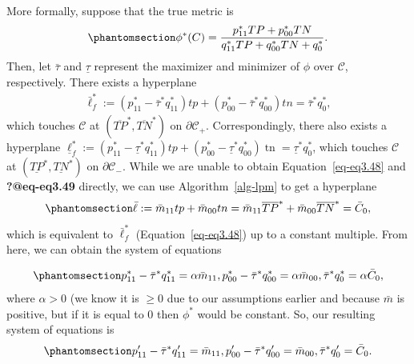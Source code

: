 \documentclass[
  letterpaper,
  numbers=noenddot,
  DIV=11]{scrreprt}
\theoremstyle{plain}
\theoremstyle{definition}
\theoremstyle{remark}
\begin{document}
More formally, suppose that the true metric is
\begin{equation}\phantomsection\label{eq-eq3.48}{\phi^{*}(C)=\frac{p_{11}^{*} T P+p_{00}^{*} T N}{q_{11}^{*} T P+q_{00}^{*} T N+q_{0}^{*}}.}\end{equation}
Then, let \(\bar{\tau}\) and \(\underline{\tau}\) represent the
maximizer and minimizer of \(\phi\) over \(\mathcal{C}\), respectively.
There exists a hyperplane \[\begin{aligned}
\bar{\ell}_{f}^{*}:=\left(p_{11}^{*}-\bar{\tau}^{*} q_{11}^{*}\right) t p+\left(p_{00}^{*}-\bar{\tau}^{*} q_{00}^{*}\right) t n=\bar{\tau}^{*} q_{0}^{*},
\end{aligned}\] which touches \(\mathcal{C}\) at
\(\left(\overline{T P}^{*}, \overline{T N}^{*}\right)\) on
\(\partial \mathcal{C}_{+}\). Correspondingly, there also exists a
hyperplane
\(\underline{\ell}_{f}^{*}:=\left(p_{11}^{*}-\underline{\tau}^{*} q_{11}^{*}\right) t p+\left(p_{00}^{*}-\underline{\tau}^{*} q_{00}^{*}\right) \operatorname{tn}=\underline{\tau}^{*} q_{0}^{*}\),
which touches \(\mathcal{C}\) at
\(\left(\underline{TP}^{*}, \underline{T N}^{*}\right)\) on
\(\partial \mathcal{C}_{-}\). While we are unable to obtain
Equation~\ref{eq-eq3.48} and \textbf{?@eq-eq3.49} directly, we can use
 Algorithm~\ref{alg-lpm}  to get a hyperplane
\begin{equation}\phantomsection\label{eq-eq3.51}{\bar{\ell}:=\bar{m}_{11} t p+\bar{m}_{00} t n= \bar{m}_{11} \overline{T P}^{*}+\bar{m}_{00} \overline{T N}^{*} = \bar{C}_{0},}\end{equation}
which is equivalent to \(\bar{\ell}_{f}^{*}\) (Equation~\ref{eq-eq3.48})
up to a constant multiple. From here, we can obtain the system of
equations

\begin{equation}\phantomsection\label{eq-eq3.52}{p_{11}^{*}-\bar{\tau}^{*} q_{11}^{*}=\alpha \bar{m}_{11}, p_{00}^{*}-\bar{\tau}^{*} q_{00}^{*}=\alpha \bar{m}_{00}, \bar{\tau}^{*} q_{0}^{*}=\alpha \bar{C}_{0},}\end{equation}
where \(\alpha > 0\) (we know it is \(\geq0\) due to our assumptions
earlier and because \(\bar{m}\) is positive, but if it is equal to \(0\)
then \(\phi^*\) would be constant. So, our resulting system of equations
is \begin{equation}\phantomsection\label{eq-eq3.53}{\begin{aligned}
    p_{11}^{\prime}-\bar{\tau}^{*} q_{11}^{\prime}=\bar{m}_{11}, p_{00}^{\prime}-\bar{\tau}^{*} q_{00}^{\prime}=\bar{m}_{00}, \bar{\tau}^{*} q_{0}^{\prime}=\bar{C}_{0}.
\end{aligned}}\end{equation}
\end{document}
